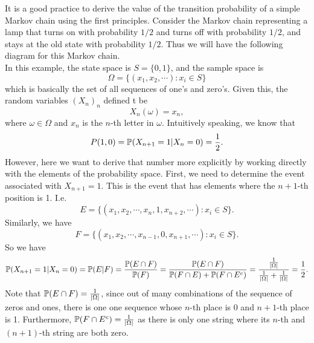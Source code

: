 \begin{example}
	It is a good practice to derive the value of the transition probability of a simple Markov chain using the first principles. Consider the Markov chain representing a lamp that turns on with probability $1/2$ and turns off with probability $1/2$, and stays at the old state with probability $1/2$. Thus we will have the following diagram for this Markov chain.
	\\
	In this example, the state space is $S = \{0,1\}$, and the sample space is
	\[ \Omega = \{ (x_1,x_2,\cdots): x_i \in S \} \]
	which is basically the set of all sequences of one's and zero's. Given this, the random variables $(X_n)_n$ defined t be
	\[  X_n (\omega) = x_n, \]  
	where $\omega \in \Omega$ and $x_n$ is the $n$-th letter in $\omega$. Intuitively speaking, we know that 
	\[  P(1,0) = \mathbb{P}(X_{n+1} = 1 | X_n = 0) = \frac{1}{2}. \]
	However, here we want to derive that number more explicitly by working directly with the elements of the probability space. First, we need to determine the event associated with $X_{n+1} = 1$. This is the event that has elements where the $n+1$-th position is 1. I.e.
	\[  E = \{  (x_1,x_2, \cdots, x_n, 1, x_{n+2}, \cdots) : x_i \in S\}.  \]
	Similarly, we have
	\[ F = \{ (x_1,x_2, \cdots, x_{n-1},0,x_{n+1},\cdots): x_i \in S \}. \]
	So we have
	\[ \mathbb{P}(X_{n+1} = 1 | X_n = 0)  = \mathbb{P}(E|F) = \frac{\mathbb{P}(E\cap F)}{\mathbb{P}(F)} =\frac{\mathbb{P}(E\cap F)}{\mathbb{P}(F\cap E) + \mathbb{P}(F\cap E^c)} = \frac{\frac{1}{|\Omega|}}{\frac{1}{|\Omega|} + \frac{1}{|\Omega|}} = \frac{1}{2}. \]
	Note that $\mathbb{P}(E\cap F) = \frac{1}{|\Omega|}$, since out of many combinations of the sequence of zeros and ones, there is one one sequence whose $n$-th place is 0 and $n+1$-th place is 1. Furthermore, $\mathbb{P}(F\cap E^c) = \frac{1}{|\Omega|}$ as there is only one string where its $n$-th and $(n+1)$-th string are both zero. 
\end{example}

